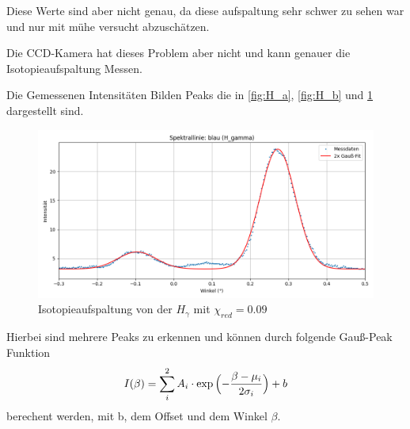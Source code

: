 Diese Werte sind aber nicht genau, da diese aufspaltung sehr schwer zu sehen war und nur mit mühe versucht abzuschätzen.

Die CCD-Kamera hat dieses Problem aber nicht und kann genauer die Isotopieaufspaltung Messen.

Die Gemessenen Intensitäten Bilden Peaks die in \cref{fig:H_a}, \cref{fig:H_b} und \cref{fig:H_g} dargestellt sind. 
\begin{figure}[H]
    \centering
    \includegraphics[width=\linewidth]{figs/dt_lila_145_51_5.png}
    \caption{Isotopieaufspaltung von der $H_{\gamma}$ mit $\chi_{red} = 0.09$}
    \label{fig:H_g}
\end{figure}

Hierbei sind mehrere Peaks zu erkennen und können durch folgende Gauß-Peak Funktion 
\begin{equation}
    I(\beta) = \sum_i^2 A_i \cdot \exp{\Bigl(-\frac{\beta-\mu_i}{2\sigma_i}}\Bigr) +b
\end{equation}
berechent werden, mit b, dem Offset und dem Winkel $\beta$. 


